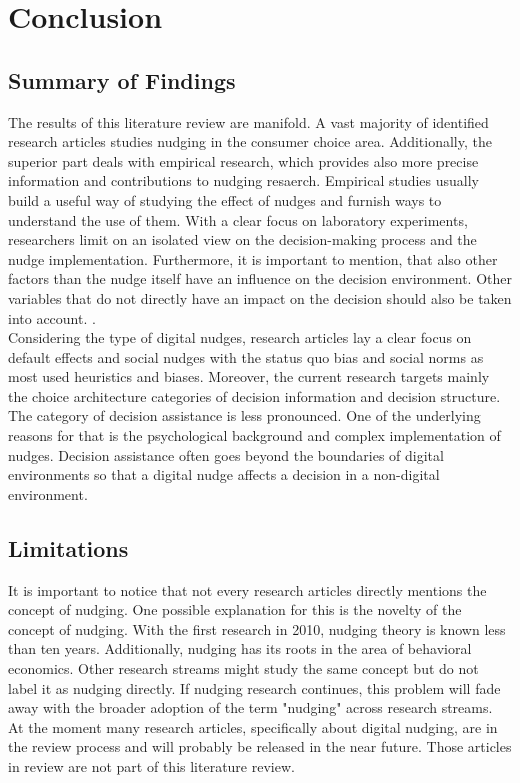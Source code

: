 \section{Conclusion}

 \subsection{Summary of Findings}
The results of this literature review are manifold. A vast majority of identified research articles studies nudging in the consumer choice area. Additionally, the superior part deals with empirical research, which provides also more precise information and contributions to nudging resaerch. Empirical studies usually build a useful way of studying the effect of nudges and furnish ways to understand the use of them. With a clear focus on laboratory experiments, researchers limit on an isolated view on the decision-making process and the nudge implementation. Furthermore, it is important to mention, that also other factors than the nudge itself have an influence on the decision environment.  Other variables that do not directly have an impact on the decision should also be taken into account. \cite{dong_cueing_2019}.
\\

Considering the type of digital nudges, research articles lay a clear focus on default effects and social nudges with the status quo bias and social norms as most used heuristics and biases. Moreover, the current research targets mainly the choice architecture categories of decision information and decision structure. The category of decision assistance is less pronounced. One of the underlying reasons for that is the psychological background and complex implementation of nudges. Decision assistance often goes beyond the boundaries of digital environments so that a digital nudge affects a decision in a non-digital environment. 
 
\subsection{Limitations}
It is important to notice that not every research articles directly mentions the concept of nudging. One possible explanation for this is the novelty of the concept of nudging. With the first research in 2010, nudging theory is known less than ten years. Additionally, nudging has its roots in the area of behavioral economics. Other research streams might study the same concept but do not label it as nudging directly. If nudging research continues, this problem will fade away with the broader adoption of the term "nudging" across research streams. At the moment many research articles, specifically about digital nudging, are in the review process and will probably be released in the near future. Those articles in review are not part of this literature review. %
\\

